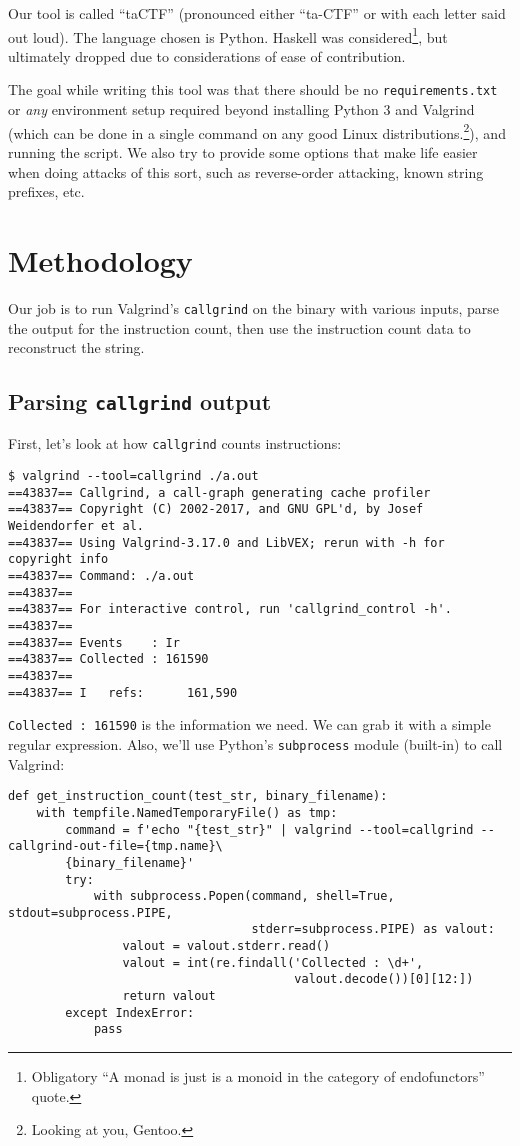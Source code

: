 \documentclass[11pt]{article}
\begin{document}
Our tool is called ``taCTF'' (pronounced either ``ta-CTF'' or with each
letter said out loud). The language chosen is Python. Haskell was
considered\footnote{Obligatory ``A monad is just is a monoid in the category of endofunctors'' quote.}, but ultimately dropped due to considerations of ease of
contribution.

The goal while writing this tool was that there should be no
\texttt{requirements.txt} or \emph{any} environment setup required beyond
installing Python 3 and Valgrind (which can be done in a single
command on any good Linux distributions.\footnote{Looking at you, Gentoo.}), and running the
script. We also try to provide some options that make life easier when
doing attacks of this sort, such as reverse-order attacking, known
string prefixes, etc.

\section{Methodology}
\label{sec:org791caae}

Our job is to run Valgrind's \texttt{callgrind} on the binary with various
inputs, parse the output for the instruction count, then use the
instruction count data to reconstruct the string.

\subsection{Parsing \texttt{callgrind} output}
\label{sec:org1f8a2a4}

First, let's look at how \texttt{callgrind} counts instructions:

\begin{verbatim}
$ valgrind --tool=callgrind ./a.out
==43837== Callgrind, a call-graph generating cache profiler
==43837== Copyright (C) 2002-2017, and GNU GPL'd, by Josef Weidendorfer et al.
==43837== Using Valgrind-3.17.0 and LibVEX; rerun with -h for copyright info
==43837== Command: ./a.out
==43837==
==43837== For interactive control, run 'callgrind_control -h'.
==43837==
==43837== Events    : Ir
==43837== Collected : 161590
==43837==
==43837== I   refs:      161,590
\end{verbatim}

\texttt{Collected : 161590} is the information we need. We can grab it with a
simple regular expression. Also, we'll use Python's \texttt{subprocess}
module (built-in) to call Valgrind:
\begin{verbatim}
def get_instruction_count(test_str, binary_filename):
    with tempfile.NamedTemporaryFile() as tmp:
        command = f'echo "{test_str}" | valgrind --tool=callgrind --callgrind-out-file={tmp.name}\
        {binary_filename}'
        try:
            with subprocess.Popen(command, shell=True, stdout=subprocess.PIPE,
                                  stderr=subprocess.PIPE) as valout:
                valout = valout.stderr.read()
                valout = int(re.findall('Collected : \d+',
                                        valout.decode())[0][12:])
                return valout
        except IndexError:
            pass
\end{verbatim}
\end{document}
